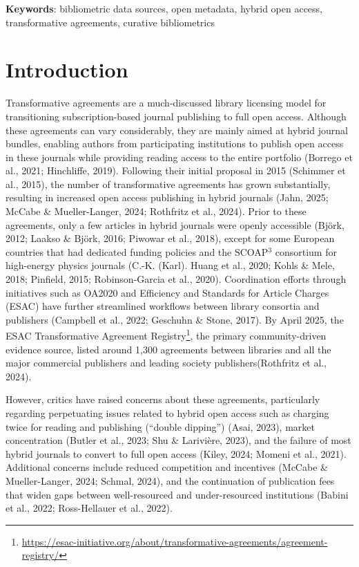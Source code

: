 \documentclass[a4paper,man,floatsintext,longtable,noextraspace,10pt]{apa6}
\begin{document}
{\textbf{Keywords}: bibliometric data sources, open metadata, hybrid open access, transformative agreements, curative bibliometrics}

\newpage

\setcounter{secnumdepth}{2}

\section{Introduction}\label{introduction}

Transformative agreements are a much-discussed library licensing model
for transitioning subscription-based journal publishing to full open
access. Although these agreements can vary considerably, they are mainly
aimed at hybrid journal bundles, enabling authors from participating
institutions to publish open access in these journals while providing
reading access to the entire portfolio (Borrego et al., 2021;
Hinchliffe, 2019). Following their initial proposal in 2015 (Schimmer et
al., 2015), the number of transformative agreements has grown
substantially, resulting in increased open access publishing in hybrid
journals (Jahn, 2025; McCabe \& Mueller-Langer, 2024; Rothfritz et al.,
2024). Prior to these agreements, only a few articles in hybrid journals
were openly accessible (Björk, 2012; Laakso \& Björk, 2016; Piwowar et
al., 2018), except for some European countries that had dedicated
funding policies and the SCOAP\(^3\) consortium for high-energy physics
journals (C.-K. (Karl). Huang et al., 2020; Kohls \& Mele, 2018;
Pinfield, 2015; Robinson-Garcia et al., 2020). Coordination efforts
through initiatives such as OA2020 and Efficiency and Standards for
Article Charges (ESAC) have further streamlined workflows between
library consortia and publishers (Campbell et al., 2022; Geschuhn \&
Stone, 2017). By April 2025, the ESAC Transformative Agreement
Registry\footnote{\url{https://esac-initiative.org/about/transformative-agreements/agreement-registry/}},
the primary community-driven evidence source, listed around 1,300
agreements between libraries and all the major commercial publishers and
leading society publishers(Rothfritz et al., 2024).

However, critics have raised concerns about these agreements,
particularly regarding perpetuating issues related to hybrid open access
such as charging twice for reading and publishing (``double dipping'')
(Asai, 2023), market concentration (Butler et al., 2023; Shu \&
Larivière, 2023), and the failure of most hybrid journals to convert to
full open access (Kiley, 2024; Momeni et al., 2021). Additional concerns
include reduced competition and incentives (McCabe \& Mueller-Langer,
2024; Schmal, 2024), and the continuation of publication fees that widen
gaps between well-resourced and under-resourced institutions (Babini et
al., 2022; Ross-Hellauer et al., 2022).
\end{document}
